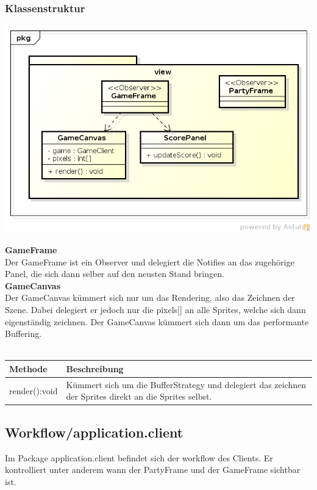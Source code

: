 \documentclass[11pt]{scrartcl}
\begin{document}
\subsubsection{Klassenstruktur}
\includegraphics[scale=0.8]{ClassDiagramView}


\textbf{GameFrame}\\
Der GameFrame ist ein Observer und delegiert die Notifies an das zugehörige Panel, die sich dann selber auf den neusten Stand bringen.\\

\textbf{GameCanvas}\\
Der GameCanvas kümmert sich nur um das Rendering, also das Zeichnen der Szene. Dabei delegiert er jedoch nur die pixels[] an alle Sprites, welche sich dann eigenständig zeichnen. Der GameCanvas kümmert sich dann um das performante Buffering.\\\\
\begin{tabularx}{\linewidth}{l p{12cm}}
\textbf{Methode} & \textbf{Beschreibung}\\
\hline
render():void & Kümmert sich um die BufferStrategy und delegiert das zeichnen der Sprites direkt an die Sprites selbst.
\end{tabularx}

\newpage

\subsection{Workflow/application.client}
Im Package application.client befindet sich der workflow des Clients. Er kontrolliert unter anderem wann der PartyFrame und der GameFrame sichtbar ist.
\end{document}
